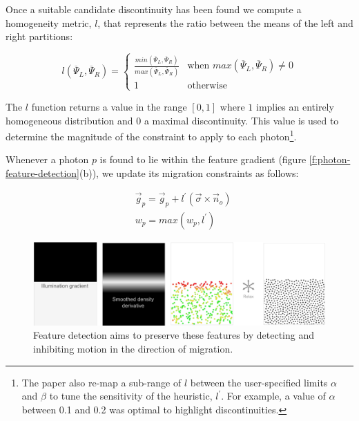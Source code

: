 Once a suitable candidate discontinuity has been found we compute a homogeneity metric, $l$, that represents the ratio between the means of the left and right partitions:

\begin{equation*}
	l(\overline{\Psi}_L,\overline{\Psi}_R)=
	\begin{cases}
		\frac{min(\overline{\Psi}_L,\overline{\Psi}_R)}{max(\overline{\Psi}_L,\overline{\Psi}_R)} & \text{when } max(\overline{\Psi}_L,\overline{\Psi}_R)\neq 0 \\
		1 & \text{otherwise}
	\end{cases}
\end{equation*}

The $l$ function returns a value in the range $[0,1]$ where $1$ implies an entirely homogeneous distribution and $0$ a maximal discontinuity. This value is used to determine the magnitude of the constraint to apply to each photon\footnote{The paper also re-map a sub-range of $l$ between the user-specified limits $\alpha$ and $\beta$ to tune the sensitivity of the heuristic, $l^{'}$. For example, a value of $\alpha$ between 0.1 and 0.2 was optimal to highlight discontinuities.}.

Whenever a photon $p$ is found to lie within the feature gradient (figure \ref{f:photon-feature-detection}(b)), we update its migration constraints as follows:

\begin{equation*}
\begin{aligned}
	&\vec{g}_p=\vec{g}_p+l^{'}(\vec{\sigma}\times\vec{n}_o)\\
	&w_p=max(w_p,l^{'})
\end{aligned}
\end{equation*}

\begin{figure}\label{f:after-feature-detection}
	\includegraphics[width=1.0\textwidth]{graphics/pm/pm-16-3}
	\caption{Feature detection aims to preserve these features by detecting and inhibiting motion in the direction of migration.}
\end{figure}

